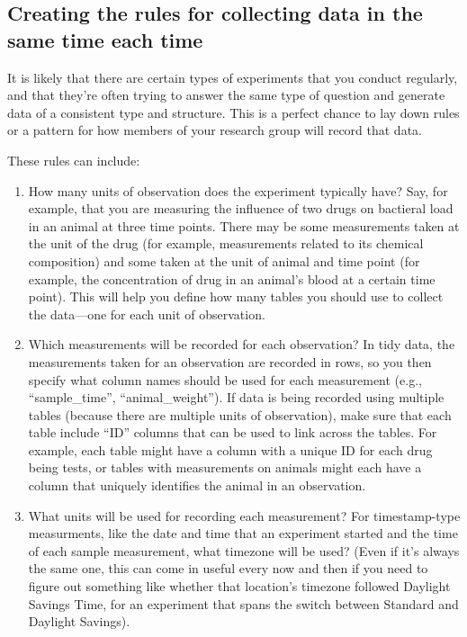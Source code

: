 \documentclass[]{tufte-book}
\providecommand{\tightlist}{%
  \setlength{\itemsep}{0pt}\setlength{\parskip}{0pt}}
\begin{document}
\hypertarget{creating-the-rules-for-collecting-data-in-the-same-time-each-time}{%
\subsection{Creating the rules for collecting data in the same time each time}\label{creating-the-rules-for-collecting-data-in-the-same-time-each-time}}

It is likely that there are certain types of experiments that you conduct
regularly, and that they're often trying to answer the same type of
question and generate data of a consistent type and structure. This is
a perfect chance to lay down rules or a pattern for how members of
your research group will record that data.

These rules can include:

\begin{enumerate}
\def\labelenumi{\arabic{enumi}.}
\tightlist
\item
  How many units of observation does the experiment typically have?
  Say, for example, that you are measuring the influence of two drugs on
  bactieral load in an animal at
  three time points. There may be some measurements taken at the unit of the drug
  (for example, measurements related to its chemical composition) and some
  taken at the unit of animal and time point (for example, the concentration of drug in
  an animal's blood at a certain time point). This will help you define how many
  tables you should use to collect the data---one for each unit of observation.
\item
  Which measurements will be recorded for each observation? In tidy data, the measurements
  taken for an observation are recorded in rows, so you then specify what
  column names should be used for each measurement (e.g., ``sample\_time'',
  ``animal\_weight''). If data is being recorded using multiple tables (because there
  are multiple units of observation), make sure that each table include
  ``ID'' columns that can be used to link across the tables. For example, each
  table might have a column with a unique ID for each drug being tests, or tables
  with measurements on animals might each have a column that uniquely identifies
  the animal in an observation.
\item
  What units will be used for recording each measurement? For timestamp-type
  measurments, like the date and time that an experiment started and the time of
  each sample measurement, what timezone will be used? (Even if it's always the
  same one, this can come in useful every now and then if you need to figure out
  something like whether that location's timezone followed Daylight Savings Time,
  for an experiment that spans the switch between Standard and Daylight Savings).
\end{enumerate}
\end{document}
